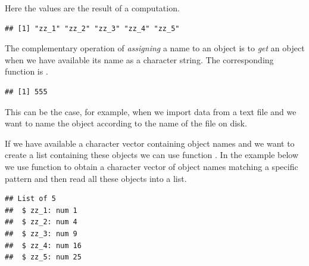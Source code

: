 \documentclass[krantz2]{krantz}\usepackage{knitr}%
\begin{document}
Here the  values are the result of a computation.
\begin{knitrout}\footnotesize
{}\color{fgcolor}\begin{kframe}
\begin{alltt}
   \hlopt{:}\hlstd{) \{}
   \hlstd{(}\hlstd{(}  \hlstd{=} \hlopt{^}\hlstd{)}
\hlstd{\}}
\hlstd{(} \hlstd{=} \hlstd{)}
\end{alltt}
\begin{verbatim}
## [1] "zz_1" "zz_2" "zz_3" "zz_4" "zz_5"
\end{verbatim}
\end{kframe}
\end{knitrout}

The complementary operation of \emph{assigning} a name to an object is to \emph{get} an object when we have available its name as a character string. The corresponding function is .

\begin{knitrout}\footnotesize
{}\color{fgcolor}\begin{kframe}
\begin{alltt}
 \hlkwb{<-} 
\hlstd{(}\hlstd{)}
\end{alltt}
\begin{verbatim}
## [1] 555
\end{verbatim}
\end{kframe}
\end{knitrout}

This can be the case, for example, when we import data from a text file and we want to name the object according to the name of the file on disk.

If we have available a character vector containing object names and we want to create a list containing these objects we can use function . In the example below we use function  to obtain a character vector of object names matching a specific pattern and then read all these objects into a list.

\begin{knitrout}\footnotesize
{}\color{fgcolor}\begin{kframe}
\begin{alltt}
 \hlkwb{<-} \hlstd{(} \hlstd{=} \hlstd{)}
 \hlkwb{<-} 
\end{alltt}
\begin{verbatim}
## List of 5
##  $ zz_1: num 1
##  $ zz_2: num 4
##  $ zz_3: num 9
##  $ zz_4: num 16
##  $ zz_5: num 25
\end{verbatim}
\end{kframe}
\end{knitrout}
\end{document}
